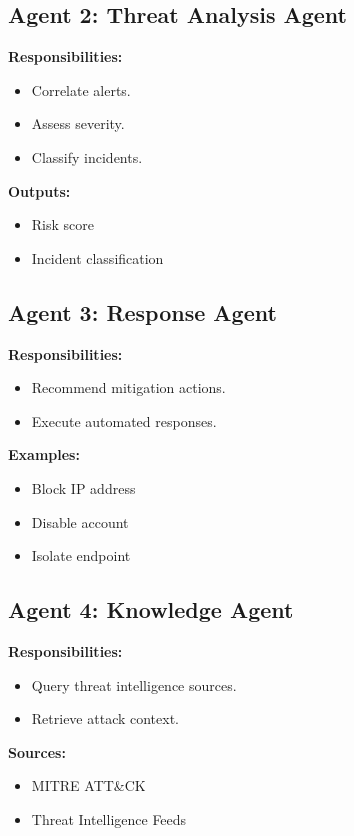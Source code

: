 \documentclass[12pt,a4paper]{report}
\begin{document}
\subsection{Agent 2: Threat Analysis Agent}

\textbf{Responsibilities:}
\begin{itemize}
    \item Correlate alerts.
    \item Assess severity.
    \item Classify incidents.
\end{itemize}

\textbf{Outputs:}
\begin{itemize}
    \item Risk score
    \item Incident classification
\end{itemize}

\subsection{Agent 3: Response Agent}

\textbf{Responsibilities:}
\begin{itemize}
    \item Recommend mitigation actions.
    \item Execute automated responses.
\end{itemize}

\textbf{Examples:}
\begin{itemize}
    \item Block IP address
    \item Disable account
    \item Isolate endpoint
\end{itemize}

\subsection{Agent 4: Knowledge Agent}

\textbf{Responsibilities:}
\begin{itemize}
    \item Query threat intelligence sources.
    \item Retrieve attack context.
\end{itemize}

\textbf{Sources:}
\begin{itemize}
    \item MITRE ATT\&CK
    \item Threat Intelligence Feeds
\end{itemize}
\end{document}
